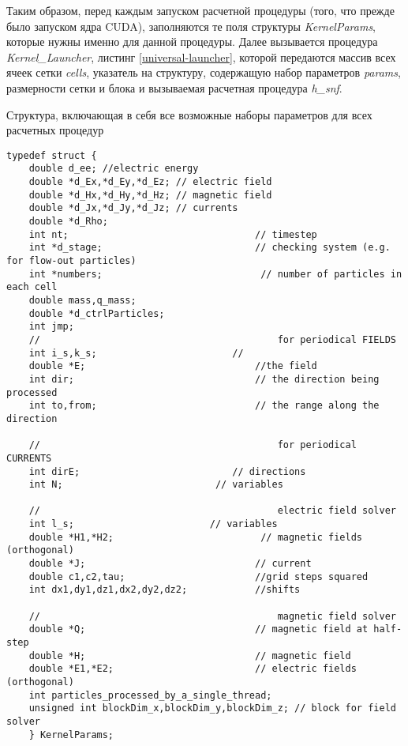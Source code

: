 Таким образом, перед каждым запуском расчетной процедуры (того, что прежде было запуском ядра CUDA), заполняются те поля структуры \textit{KernelParams}, которые нужны именно для данной процедуры.
Далее вызывается процедура \textit{Kernel\_Launcher}, листинг \ref{universal-launcher}, которой передаются массив всех ячеек сетки \textit{cells}, указатель на структуру, содержащую набор параметров \textit{params}, размерности сетки и блока  и вызываемая расчетная процедура \textit{h\_snf}.

\begin{ListingEnv}[!h]
\captiondelim{ } %
\caption{Структура, включающая в себя все возможные наборы параметров для всех расчетных процедур}
\label{parameter-struct}	
 \begin{lstlisting}[language={[ISO]C++}]
	typedef struct {
	double d_ee; //electric energy
	double *d_Ex,*d_Ey,*d_Ez; // electric field
	double *d_Hx,*d_Hy,*d_Hz; // magnetic field
	double *d_Jx,*d_Jy,*d_Jz; // currents
	double *d_Rho;
	int nt;                                 // timestep
	int *d_stage;                           // checking system (e.g. for flow-out particles)
	int *numbers;                            // number of particles in each cell
	double mass,q_mass;
	double *d_ctrlParticles;
	int jmp;
	//	                                        for periodical FIELDS
	int i_s,k_s;                        //
	double *E;                              //the field
	int dir;                                // the direction being processed
	int to,from;                            // the range along the direction
	
	//	                                        for periodical CURRENTS
	int dirE;                           // directions
	int N;                           // variables
	
	//                                          electric field solver
	int l_s;                        // variables
	double *H1,*H2;                          // magnetic fields (orthogonal)
	double *J;                              // current
	double c1,c2,tau;                       //grid steps squared
	int dx1,dy1,dz1,dx2,dy2,dz2;            //shifts
	
	//	                                        magnetic field solver
	double *Q;                              // magnetic field at half-step
	double *H;                              // magnetic field
	double *E1,*E2;                         // electric fields (orthogonal)
	int particles_processed_by_a_single_thread;
	unsigned int blockDim_x,blockDim_y,blockDim_z; // block for field solver
	} KernelParams;
	 \end{lstlisting}
	\end{ListingEnv}
\clearpage





